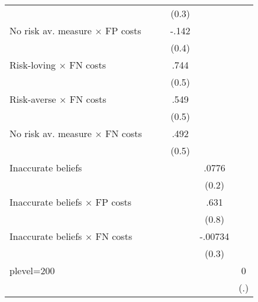 \begin{table}[htbp]
\begin{tabular}{l*{5}{c}}
                &                  &                  &    (0.3)         &                  &                  \\
No risk av. measure $\times$ FP costs&                  &                  &    -.142         &                  &                  \\
                &                  &                  &    (0.4)         &                  &                  \\
Risk-loving $\times$ FN costs&                  &                  &     .744         &                  &                  \\
                &                  &                  &    (0.5)         &                  &                  \\
Risk-averse $\times$ FN costs&                  &                  &     .549         &                  &                  \\
                &                  &                  &    (0.5)         &                  &                  \\
No risk av. measure $\times$ FN costs&                  &                  &     .492         &                  &                  \\
                &                  &                  &    (0.5)         &                  &                  \\
Inaccurate beliefs&                  &                  &                  &    .0776         &                  \\
                &                  &                  &                  &    (0.2)         &                  \\
Inaccurate beliefs $\times$ FP costs&                  &                  &                  &     .631         &                  \\
                &                  &                  &                  &    (0.8)         &                  \\
Inaccurate beliefs $\times$ FN costs&                  &                  &                  &  -.00734         &                  \\
                &                  &                  &                  &    (0.3)         &                  \\
plevel=200      &                  &                  &                  &                  &        0         \\
                &                  &                  &                  &                  &      (.)         \\

\end{tabular}
\end{table}
